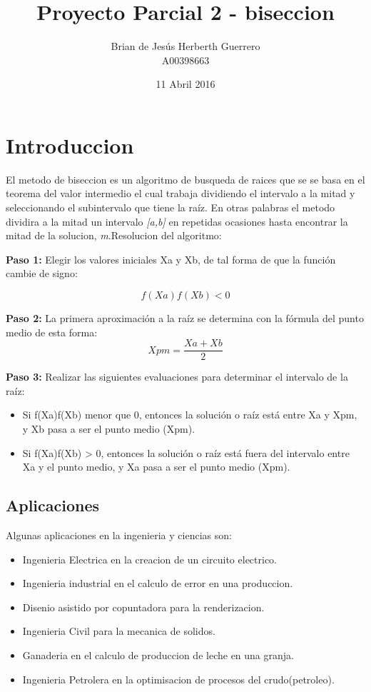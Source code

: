 \documentclass[11pt]{article}
\title{\textbf{Proyecto Parcial 2 - biseccion}}
\author{Brian de Jesús Herberth Guerrero\\
		A00398663}
\date{11 Abril 2016}
\begin{document}
\maketitle
\tableofcontents
\clearpage

\section{Introduccion}
El metodo de biseccion es un algoritmo de busqueda de raices que se  se basa en el teorema del valor intermedio el cual trabaja dividiendo el intervalo a la mitad y seleccionando el subintervalo que tiene la raíz. En otras palabras el metodo dividira a la mitad un intervalo \emph{[a,b]} en repetidas ocasiones hasta encontrar la mitad de la solucion, \emph{m}.Resolucion del algoritmo:\\

\begin{flushleft}
\textbf{Paso 1:}
Elegir los valores iniciales Xa y Xb, de tal forma de que la función cambie de signo:

\begin{equation*}
  f(Xa)f(Xb) < 0
\end{equation*}

\textbf{Paso 2:}
La primera aproximación a la raíz se determina con la fórmula del punto medio de esta forma:
\begin{equation*}
  Xpm=\frac{Xa+Xb}{2}
\end{equation*}

\textbf{Paso 3:}
Realizar las siguientes evaluaciones para determinar el intervalo de la raíz:
\begin{itemize}
  \item Si f(Xa)f(Xb) menor que 0, entonces la solución o raíz está entre Xa y Xpm, y Xb pasa a ser el punto medio (Xpm).
  \item Si f(Xa)f(Xb) > 0, entonces la solución o raíz está fuera del intervalo entre Xa y el punto medio, y Xa pasa a ser el punto medio (Xpm).
\end{itemize}

\end{flushleft}
\clearpage

\subsection{Aplicaciones}
Algunas aplicaciones en la ingenieria y ciencias son:
\begin{itemize}
\item Ingenieria Electrica en la creacion de un circuito electrico.
\item Ingenieria industrial en el calculo de error en una produccion.
\item Disenio asistido por copuntadora para la renderizacion.
\item Ingenieria Civil para la mecanica de solidos.
\item Ganaderia en el calculo de produccion de leche en una granja.
\item Ingenieria Petrolera en la optimisacion de procesos del crudo(petroleo).
\end{itemize}
\end{document}
